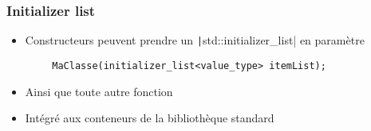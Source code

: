 \documentclass[C++.tex]{subfiles}
\begin{document}
\begin{frame}[fragile]
	\frametitle{Initializer list}
	\begin{itemize}
		\item Constructeurs peuvent prendre un \texttt|std::initializer_list| en paramètre
	\end{itemize}

	\begin{verbatim}
		MaClasse(initializer_list<value_type> itemList);
	\end{verbatim}

	\begin{itemize}
		\item Ainsi que toute autre fonction
		\item Intégré aux conteneurs de la bibliothèque standard
	\end{itemize}

\end{frame}
\end{document}
